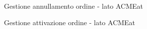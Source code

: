 \documentclass[11pt]{article} %
\begin{document}
\begin{figure}[p]
\begin{center}
\caption{Gestione annullamento ordine - lato ACMEat}
\end{center}
\end{figure}

\begin{figure}[p]
\begin{center}
\caption{Gestione attivazione ordine - lato ACMEat}
\end{center}
\end{figure}
\end{document}
